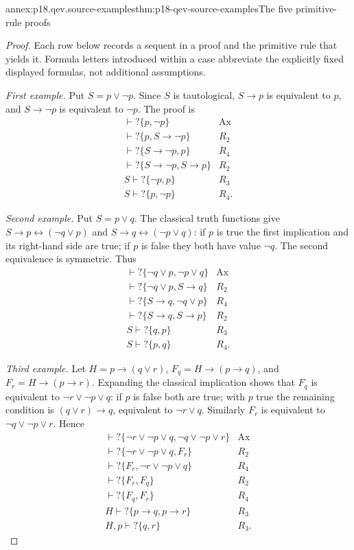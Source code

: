 \begin{annexitem}{annex:p18.qev.source-examples}{thm:p18-qev-source-examples}{The five primitive-rule proofs}
\begin{proof}
Each row below records a sequent in a proof and the primitive rule
that yields it. Formula letters introduced within a case abbreviate
the explicitly fixed displayed formulas, not additional assumptions.

\emph{First example.} Put \(S=p\lor\neg p\). Since \(S\)
is tautological, \(S\to p\) is equivalent to \(p\), and
\(S\to\neg p\) is equivalent to \(\neg p\). The proof is
\[
\begin{array}{ll}
\vdash?\{p,\neg p\}&\mathrm{Ax}\\
\vdash?\{p,S\to\neg p\}&R_2\\
\vdash?\{S\to\neg p,p\}&R_4\\
\vdash?\{S\to\neg p,S\to p\}&R_2\\
S\vdash?\{\neg p,p\}&R_3\\
S\vdash?\{p,\neg p\}&R_4.
\end{array}
\]

\emph{Second example.} Put \(S=p\lor q\). The classical
truth functions give
\(S\to p\leftrightarrow(\neg q\lor p)\) and
\(S\to q\leftrightarrow(\neg p\lor q)\): if \(p\) is
true the first implication and its right-hand side are true; if
\(p\) is false they both have value \(\neg q\). The second
equivalence is symmetric. Thus
\[
\begin{array}{ll}
\vdash?\{\neg q\lor p,\neg p\lor q\}&\mathrm{Ax}\\
\vdash?\{\neg q\lor p,S\to q\}&R_2\\
\vdash?\{S\to q,\neg q\lor p\}&R_4\\
\vdash?\{S\to q,S\to p\}&R_2\\
S\vdash?\{q,p\}&R_3\\
S\vdash?\{p,q\}&R_4.
\end{array}
\]

\emph{Third example.} Let
\(H=p\to(q\lor r)\),
\(F_q=H\to(p\to q)\), and
\(F_r=H\to(p\to r)\). Expanding the classical implication
shows that \(F_q\) is equivalent to \(\neg r\lor\neg p\lor q\):
if \(p\) is false both are true; with \(p\) true the remaining
condition is \((q\lor r)\to q\), equivalent to
\(\neg r\lor q\). Similarly \(F_r\) is equivalent to
\(\neg q\lor\neg p\lor r\). Hence
\[
\begin{array}{ll}
\vdash?\{\neg r\lor\neg p\lor q,\neg q\lor\neg p\lor r\}&\mathrm{Ax}\\
\vdash?\{\neg r\lor\neg p\lor q,F_r\}&R_2\\
\vdash?\{F_r,\neg r\lor\neg p\lor q\}&R_4\\
\vdash?\{F_r,F_q\}&R_2\\
\vdash?\{F_q,F_r\}&R_4\\
H\vdash?\{p\to q,p\to r\}&R_3\\
H,p\vdash?\{q,r\}&R_3.
\end{array}
\]


\end{proof}
\end{annexitem}
